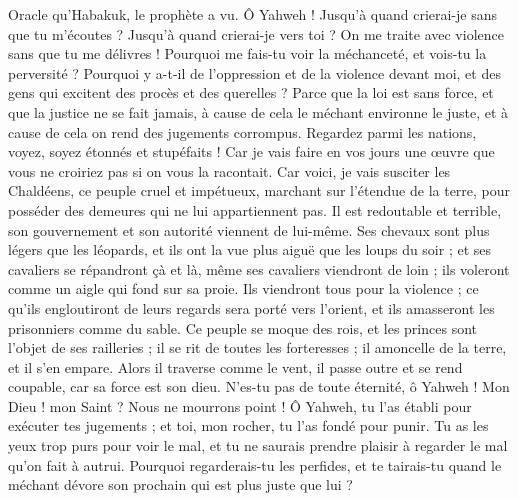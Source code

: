 \begin{multicols}{2}
\VerseOne{}Oracle qu'Habakuk, le prophète a vu.
Ô Yahweh ! Jusqu'à quand crierai-je sans que tu m'écoutes ? Jusqu'à quand crierai-je vers toi ? On me traite avec violence sans que tu me délivres !
Pourquoi me fais-tu voir la méchanceté, et vois-tu la perversité ? Pourquoi y a-t-il de l'oppression et de la violence devant moi, et des gens qui excitent des procès et des querelles ?
Parce que la loi est sans force, et que la justice ne se fait jamais, à cause de cela le méchant environne le juste, et à cause de cela on rend des jugements corrompus.
Regardez parmi les nations, voyez, soyez étonnés et stupéfaits ! Car je vais faire en vos jours une œuvre que vous ne croiriez pas si on vous la racontait.
Car voici, je vais susciter les Chaldéens, ce peuple cruel et impétueux, marchant sur l'étendue de la terre, pour posséder des demeures qui ne lui appartiennent pas.
Il est redoutable et terrible, son gouvernement et son autorité viennent de lui-même.
Ses chevaux sont plus légers que les léopards, et ils ont la vue plus aiguë que les loups du soir ; et ses cavaliers se répandront çà et là, même ses cavaliers viendront de loin ; ils voleront comme un aigle qui fond sur sa proie.
Ils viendront tous pour la violence ; ce qu'ils engloutiront de leurs regards sera porté vers l'orient, et ils amasseront les prisonniers comme du sable.
Ce peuple se moque des rois, et les princes sont l'objet de ses railleries ; il se rit de toutes les forteresses ; il amoncelle de la terre, et il s'en empare.
Alors il traverse comme le vent, il passe outre et se rend coupable, car sa force est son dieu.
N'es-tu pas de toute éternité, ô Yahweh ! Mon Dieu ! mon Saint ? Nous ne mourrons point ! Ô Yahweh, tu l'as établi pour exécuter tes jugements ; et toi, mon rocher, tu l'as fondé pour punir.
Tu as les yeux trop purs pour voir le mal, et tu ne saurais prendre plaisir à regarder le mal qu'on fait à autrui. Pourquoi regarderais-tu les perfides, et te tairais-tu quand le méchant dévore son prochain qui est plus juste que lui ?

\end{multicols}
